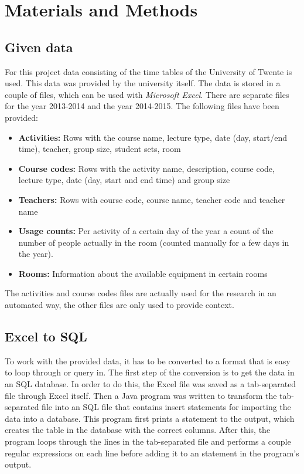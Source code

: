\section{Materials and Methods}
\subsection{Given data}
For this project data consisting of the time tables of the University of Twente is used. This data was provided by the university itself. The data is stored in a couple of  files, which can be used with \emph{Microsoft Excel}. There are separate files for the year 2013-2014 and the year 2014-2015. The following files have been provided:

\begin{itemize}
	\item \textbf{Activities:} Rows with the course name, lecture type, date (day, start/end time), teacher, group size, student sets, room
	\item \textbf{Course codes:} Rows with the activity name, description, course code, lecture type, date (day, start and end time) and group size
	\item \textbf{Teachers:} Rows with course code, course name, teacher code and teacher name
	\item \textbf{Usage counts:} Per activity of a certain day of the year a count of the number of people actually in the room (counted manually for a few days in the year).
	\item\textbf{Rooms:} Information about the available equipment in certain rooms
\end{itemize}

The activities and course codes files are actually used for the research in an automated way, the other files are only used to provide context.

\subsection{Excel to SQL}
To work with the provided data, it has to be converted to a format that is easy to loop through or query in. The first step of the conversion is to get the data in an SQL database. In order to do this, the Excel file was saved as a tab-separated file through Excel itself. Then a Java program was written to transform the tab-separated file into an SQL file that contains insert statements for importing the data into a database. This program first prints a  statement to the output, which creates the table in the database with the correct columns. After this, the program loops through the lines in the tab-separated file and performs a couple regular expressions on each line before adding it to an  statement in the program's output.

